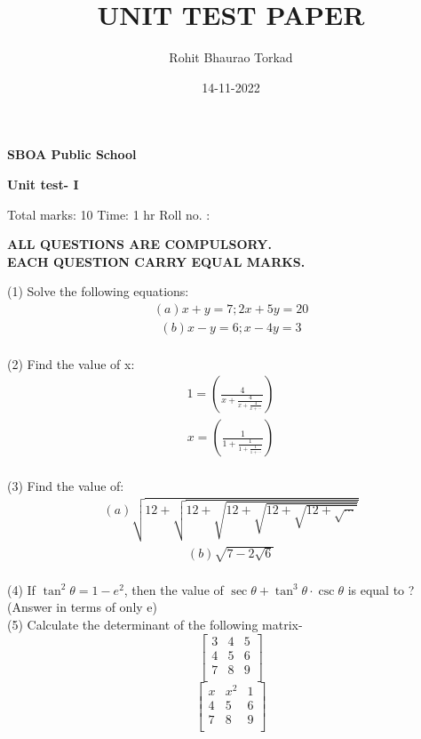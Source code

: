 \documentclass{article}
\title{UNIT TEST PAPER}
\author{Rohit Bhaurao Torkad}
\date{14-11-2022}
\begin{document}
\begin{center}
\begin{Large}
\textbf{SBOA Public School}\\
\end{Large}
\vspace{0.5cm}
\begin{large}
\textbf{Unit test- I}\\[4pt]
\end{large}
\end{center}
\begin{large}
Total marks: 10
\hspace{7cm}
Time: 1 hr
\vspace{0.5cm}
Roll no. :
\end{large}
\vspace{1cm}
\begin{center}
\textbf{ ALL QUESTIONS ARE COMPULSORY.\\
EACH QUESTION CARRY EQUAL MARKS.}
\end{center}

\vspace{1cm}
(1) Solve the following equations:
\begin{align*}
(a) x+y=7;2x+5y=20 
\end{align*}
\begin{align*}
(b) x-y=6;x-4y=3  
\end{align*}
\\[2cm]
(2) Find the value of x:
\begin{align*}
 \displaystyle {1= \left( \frac{4}{x+ \frac{4}{x + \frac{4}{x+ \cdots}}}          \right)}
\end{align*}
\begin{align*}
 \displaystyle {x= \left( \frac{1}{1+ \frac{1}{1 + \frac{1}{1+ \cdots}}}          \right)}
\end{align*}
\\[2cm]
(3) Find the value of: 
\begin{align*}
 (a)  \sqrt{12 + \sqrt{12 + \sqrt{12 + \sqrt{12 + \sqrt{12 +\sqrt{\cdots}}}}}}
\end{align*}
\begin{align*}
(b) \sqrt{7-2\sqrt{6}}
\end{align*}
\\[2cm]
(4) If $\tan^2 \theta = 1 - e^2 $, then the value of $\sec \theta + \tan^3 \theta \cdot \csc \theta $ is equal to ?(Answer in terms of only e)
\\[2cm]
(5) Calculate the determinant of the following matrix-
$$\begin{bmatrix}
3 & 4 & 5\\
4 & 5& 6\\
7 & 8 &9\\
\end{bmatrix}$$
$$\begin{bmatrix}
x & x^2 & 1\\
4 & 5& 6\\
7 & 8 &9\\
\end{bmatrix}$$
\end{document}

